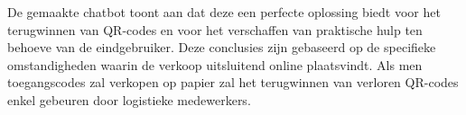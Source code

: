 De gemaakte chatbot toont aan dat deze een perfecte oplossing biedt voor het terugwinnen van QR-codes en voor het verschaffen van praktische hulp ten behoeve van de eindgebruiker. Deze conclusies zijn gebaseerd op de specifieke omstandigheden waarin de verkoop uitsluitend online plaatsvindt. Als men toegangscodes zal verkopen op papier zal het terugwinnen van verloren QR-codes enkel gebeuren door logistieke medewerkers.

